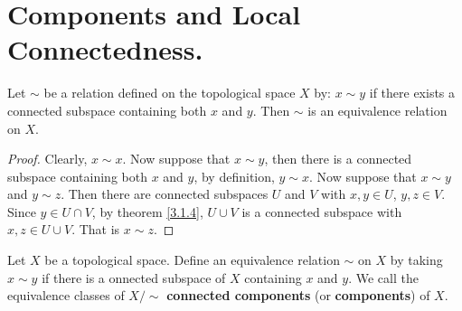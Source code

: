 
\section{Components and Local Connectedness.}

\begin{proposition}\label{3.3.1}
    Let $\sim$ be a relation defined on the topological space  $X$ by:  $x \sim y$ if there exists a
    connected subspace containing both  $x$ and  $y$. Then $\sim$ is an equivalence relation on
    $X$.
\end{proposition}
\begin{proof}
    Clearly, $x \sim x$. Now suppose that  $x \sim y$, then there is a connected subspace containing
    both  $x$ and  $y$, by definition,  $y \sim x$. Now suppose that  $x \sim y$ and  $y \sim z$.
    Then there are connected subspaces  $U$ and  $V$ with  $x,y \in U$,  $y,z \in V$. Since $y \in U
    \cap V$, by theorem \ref{3.1.4}, $U \cup V$ is a connected subspace with  $x,z \in U \cup V$.
    That is  $x \sim z$. 
\end{proof}

\begin{definition}
    Let $X$ be a topological space. Define an equivalence relation  $\sim$ on  $X$ by taking  $x
    \sim y$ if there is a onnected subspace of  $X$ containing  $x$ and  $y$. We call the
    equivalence classes of  $X/\sim$  \textbf{connected components} (or \textbf{components}) of
    $X$.
\end{definition}
